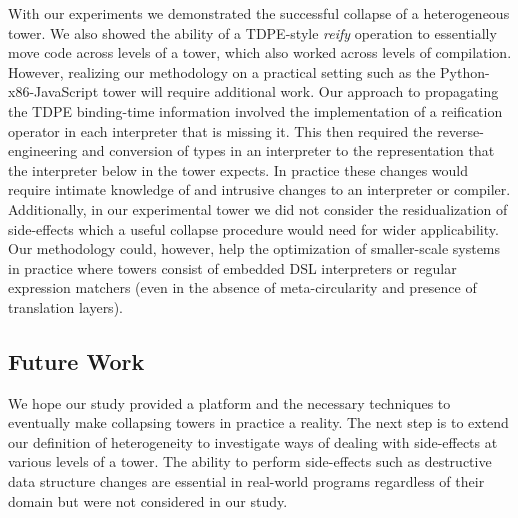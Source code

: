 \documentclass[sigplan,anonymous,review]{acmart}
\theoremstyle{definition}
\begin{document}

With our experiments we demonstrated the successful collapse of a heterogeneous tower. We also showed the ability of a TDPE-style \textit{reify} operation to essentially move code across levels of a tower, which also worked across levels of compilation. However, realizing our methodology on a practical setting such as the Python-x86-JavaScript tower will require additional work. Our approach to propagating the TDPE binding-time information involved the implementation of a reification operator in each interpreter that is missing it. This then required the reverse-engineering and conversion of types in an interpreter to the representation that the interpreter below in the tower expects. In practice these changes would require intimate knowledge of and intrusive changes to an interpreter or compiler. Additionally, in our experimental tower we did not consider the residualization of side-effects which a useful collapse procedure would need for wider applicability. Our methodology could, however, help the optimization of smaller-scale systems in practice where towers consist of embedded DSL interpreters or regular expression matchers (even in the absence of meta-circularity and presence of translation layers).

\subsection{Future Work}

We hope our study provided a platform and the necessary techniques to eventually make collapsing towers in practice a reality. The next step is to extend our definition of heterogeneity to investigate ways of dealing with side-effects at various levels of a tower. The ability to perform side-effects such as destructive data structure changes are essential in real-world programs regardless of their domain but were not considered in our study.
\end{document}
